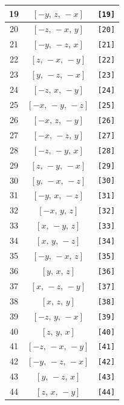 \documentclass[fleqn,8pt]{jsarticle}
\begin{document}
\begin{longtable}{ccc}
19 & $\left[ - y,\, z,\, - x \right]$ & {\tt [19]} \\ \hline
20 & $\left[ - z,\, - x,\, y \right]$ & {\tt [20]} \\ \hline
21 & $\left[ - y,\, - z,\, x \right]$ & {\tt [21]} \\ \hline
22 & $\left[ z,\, - x,\, - y \right]$ & {\tt [22]} \\ \hline
23 & $\left[ y,\, - z,\, - x \right]$ & {\tt [23]} \\ \hline
24 & $\left[ - z,\, x,\, - y \right]$ & {\tt [24]} \\ \hline
25 & $\left[ - x,\, - y,\, - z \right]$ & {\tt [25]} \\ \hline
26 & $\left[ - x,\, z,\, - y \right]$ & {\tt [26]} \\ \hline
27 & $\left[ - x,\, - z,\, y \right]$ & {\tt [27]} \\ \hline
28 & $\left[ - z,\, - y,\, x \right]$ & {\tt [28]} \\ \hline
29 & $\left[ z,\, - y,\, - x \right]$ & {\tt [29]} \\ \hline
30 & $\left[ y,\, - x,\, - z \right]$ & {\tt [30]} \\ \hline
31 & $\left[ - y,\, x,\, - z \right]$ & {\tt [31]} \\ \hline
32 & $\left[ - x,\, y,\, z \right]$ & {\tt [32]} \\ \hline
33 & $\left[ x,\, - y,\, z \right]$ & {\tt [33]} \\ \hline
34 & $\left[ x,\, y,\, - z \right]$ & {\tt [34]} \\ \hline
35 & $\left[ - y,\, - x,\, z \right]$ & {\tt [35]} \\ \hline
36 & $\left[ y,\, x,\, z \right]$ & {\tt [36]} \\ \hline
37 & $\left[ x,\, - z,\, - y \right]$ & {\tt [37]} \\ \hline
38 & $\left[ x,\, z,\, y \right]$ & {\tt [38]} \\ \hline
39 & $\left[ - z,\, y,\, - x \right]$ & {\tt [39]} \\ \hline
40 & $\left[ z,\, y,\, x \right]$ & {\tt [40]} \\ \hline
41 & $\left[ - z,\, - x,\, - y \right]$ & {\tt [41]} \\ \hline
42 & $\left[ - y,\, - z,\, - x \right]$ & {\tt [42]} \\ \hline
43 & $\left[ y,\, - z,\, x \right]$ & {\tt [43]} \\ \hline
44 & $\left[ z,\, x,\, - y \right]$ & {\tt [44]} \\ \hline

\end{longtable}
\end{document}
